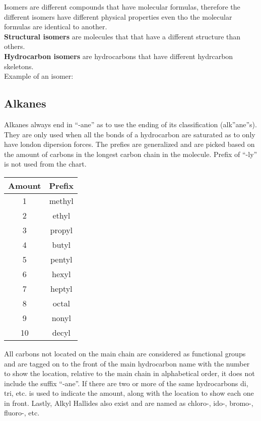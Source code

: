 \documentclass{article}
\begin{document}
\begin{paragraph}
 Isomers are different compounds that have molecular formulas, therefore the different isomers have different physical properties even tho the molecular formulas are identical to another.\\

 \textbf{Structural isomers} are molecules that that have a different structure than others.\\
 
 \textbf{Hydrocarbon isomers} are hydrocarbons that have different hydrcarbon skeletons.\\

 \noindent
 Example of an isomer: 
 \begin{center}
    \hspace{5pc} 
 \end{center}
 \vspace{5mm}

 \subsection{Alkanes}

 Alkanes always end in ``-ane'' as to use the ending of its classification (alk''ane''s). They are only used when all the bonds of a hydrocarbon are saturated as to only have london dipersion forces. The prefies are generalized and are picked based on the amount of carbons in the longest carbon chain in the molecule. Prefix of ``-ly'' is not used from the chart.

 \vspace{2mm}
\begin{center}
\begin{tabular}{|c|c|}
  \hline
  \textbf{Amount} & \textbf{Prefix}\\
  \hline\hline
  1  &  methyl  \\ \hline
  2  &  ethyl   \\ \hline
  3  &  propyl  \\ \hline
  4  &  butyl   \\ \hline
  5  &  pentyl  \\ \hline
  6  &  hexyl   \\ \hline
  7  &  heptyl  \\ \hline
  8  &  octal   \\ \hline
  9  &  nonyl   \\ \hline
  10 &  decyl   \\ \hline
 \end{tabular}
 \end{center}
\vspace{4mm}
All carbons not located on the main chain are considered as functional groups and are tagged on to the front of the main hydrocarbon name with the number to show the location, relative to the main chain in alphabetical order, it does not include the suffix ``-ane''. If there are two or more of the same hydrocarbons di, tri, etc. is used to indicate the amount, along with the location to show each one in front. Lastly, Alkyl Hallides also exist and are named as chloro-, ido-, bromo-, fluoro-, etc.\\


\end{paragraph}
\end{document}
